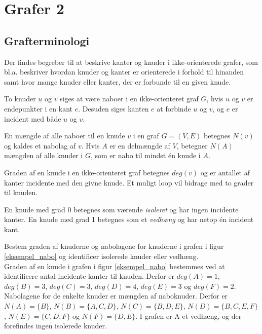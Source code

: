 \section{Grafer 2}
\subsection{Grafterminologi}

Der findes begreber til at beskrive kanter og knuder i ikke-orienterede grafer, som bl.a. beskriver hvordan knuder og kanter er orienterede i forhold til hinanden samt hvor mange knuder eller kanter, der er forbunde til en given knude.

\begin{defn}
To knuder $u$ og $v$ siges at være naboer i en ikke-orienteret graf $G$, hvis $u$ og $v$ er endepunkter i en kant $e$. Desuden siges kanten $e$ at forbinde $u$ og $v$, og $e$ er incident med både $u$ og $v$.
\end{defn}

\begin{defn}
En mængde af alle naboer til en knude $v$ i en graf $G=(V,E)$ betegnes $N(v)$ og kaldes et nabolag af $v$. Hvis $A$ er en delmængde af $V$, betegner $N(A)$ mængden af alle knuder i $G$, som er nabo til mindst én knude i $A$.
\end{defn}

\begin{defn}
Graden af en knude i en ikke-orienteret graf betegnes $deg(v)$ og er antallet af kanter incidente med den givne knude.  Et muligt loop vil bidrage med to grader til knuden. 
\end{defn}

En knude med grad 0 betegnes som værende \textit{isoleret} og har ingen incidente kanter. En knude med grad 1 betegnes som et \textit{vedhæng} og har netop én incident kant.

\begin{exmp}
Bestem graden af knuderne og nabolagene for knuderne i grafen i figur \ref{eksempel_nabo} og identificer isolerede knuder eller vedhæng.\\
Graden af en knude i grafen i figur \ref{eksempel_nabo} bestemmes ved at identificere antal incidente kanter til knuden. Derfor er $deg(A)=1$, $deg(B)=3$, $deg(C)=3$, $deg(D)=4$, $deg(E)=3$ og $deg(F)=2$. 
Nabolagene for de enkelte knuder er mængden af naboknuder. 
Derfor er $N(A)=\lbrace B \rbrace$, $N(B)=\lbrace A, C, D \rbrace$, $N(C)=\lbrace B, D, E \rbrace$, $N(D)=\lbrace B, C, E, F \rbrace$, $N(E)=\lbrace C, D, F \rbrace$ og $N(F)=\lbrace D, E \rbrace$. 
I grafen er A et vedhæng, og der forefindes ingen isolerede knuder.
\end{exmp}

